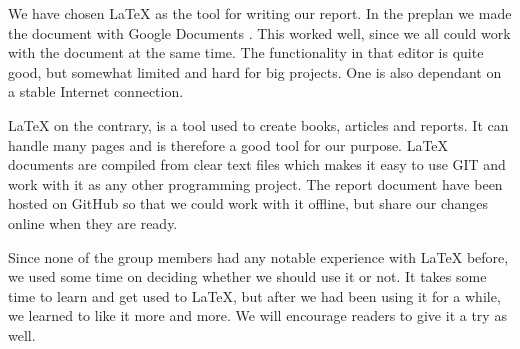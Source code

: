 We have chosen \LaTeX{} as the tool for writing our report. In the preplan we
made the document with Google Documents \cite{GoogleDrive}. This worked well, since
we all could work with the document at the same time. The functionality in that
editor is quite good, but somewhat limited and hard for big projects. One is
also dependant on a stable Internet connection. 

\LaTeX{} on the contrary, is a tool used to create books, articles and reports.
It can handle many pages and is therefore a good tool for our purpose. \LaTeX{}
documents are compiled from clear text files which makes it easy to use GIT and
work with it as any other programming project. The report document have been hosted
on GitHub so that we could work with it offline, but share our changes online
when they are ready.

Since none of the group members had any notable experience with \LaTeX{} 
before, we used some time on deciding whether we should use it or not. It takes
some time to learn and get used to \LaTeX{}, but after we had been using it for
a while, we learned to like it more and more. We will encourage readers to give
it a try as well.